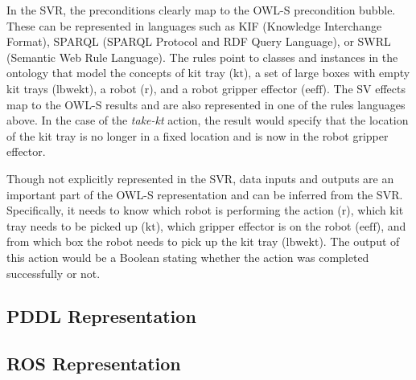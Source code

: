 In the SVR, the preconditions clearly map to the OWL-S precondition bubble. These can be represented in languages such as KIF \cite{KIF} (Knowledge Interchange Format), SPARQL \cite{SPARQL} (SPARQL Protocol and RDF Query Language), or SWRL \cite{SWRL-W3C} (Semantic Web Rule Language). The rules point to classes and instances in the ontology that model the concepts of kit tray ($\mathrm{kt}$), a set of large boxes with empty kit trays ($\mathrm{lbwekt}$), a robot ($\mathrm{r}$), and a robot gripper effector ($\mathrm{eeff}$). The SV effects map to the OWL-S results and are also represented in one of the rules languages above. In the case of the \textsl{take-kt} action, the result would specify that the location of the kit tray is no longer in a fixed location and is now in the robot gripper effector.

Though not explicitly represented in the SVR, data inputs and outputs are an important part of the OWL-S representation and can be inferred from the SVR. Specifically, it needs to know which robot is performing the action ($\mathrm{r}$), which kit tray needs to be picked up ($\mathrm{kt}$), which gripper effector is on the robot ($\mathrm{eeff}$), and from which box the robot needs to pick up the kit tray ($\mathrm{lbwekt}$). The output of this action would be a Boolean stating whether the action was completed successfully or not. 

\subsection{PDDL Representation}

\subsection{ROS Representation}